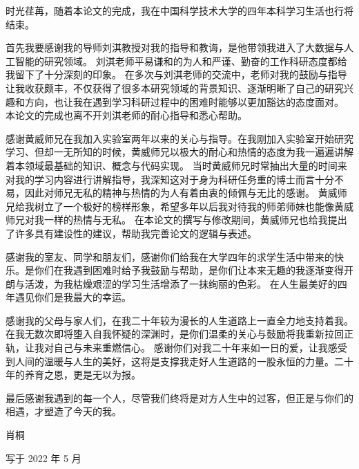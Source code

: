 
\begin{acknowledgements}



    时光荏苒，随着本论文的完成，我在中国科学技术大学的四年本科学习生活也行将结束。

    首先我要感谢我的导师刘淇教授对我的指导和教诲，是他带领我进入了大数据与人工智能的研究领域。
    刘淇老师平易谦和的为人和严谨、勤奋的工作科研态度都给我留下了十分深刻的印象。
    在多次与刘淇老师的交流中，老师对我的鼓励与指导让我收获颇丰，不仅获得了很多本研究领域的背景知识、逐渐明晰了自己的研究兴趣和方向，也让我在遇到学习科研过程中的困难时能够以更加豁达的态度面对。
    本论文的完成也离不开刘淇老师的耐心指导和悉心帮助。

    感谢黄威师兄在我加入实验室两年以来的关心与指导。在我刚加入实验室开始研究学习、但却一无所知的时候，黄威师兄以极大的耐心和热情的态度为我一遍遍讲解着本领域最基础的知识、概念与代码实现。
    当时黄威师兄时常抽出大量的时间来对我的学习内容进行讲解指导，我深知这对于身为科研任务重的博士而言十分不易，因此对师兄无私的精神与热情的为人有着由衷的倾佩与无比的感谢。
    黄威师兄给我树立了一个极好的榜样形象，希望多年以后我对待我的师弟师妹也能像黄威师兄对我一样的热情与无私。
    在本论文的撰写与修改期间，黄威师兄也给我提出了许多具有建设性的建议，帮助我完善论文的逻辑与表述。

    感谢我的室友、同学和朋友们，感谢你们给我在大学四年的求学生活中带来的快乐。是你们在我遇到困难时给予我鼓励与帮助，是你们让本来无趣的我逐渐变得开朗与活泼，为我枯燥艰涩的学习生活增添了一抹绚丽的色彩。
    在人生最美好的四年遇见你们是我最大的幸运。

    感谢我的父母与家人们，在我二十年较为漫长的人生道路上一直全力地支持着我。在我无数次即将堕入自我怀疑的深渊时，是你们温柔的关心与鼓励将我重新拉回正轨，让我对自己与未来重燃信心。
    感谢你们对我二十年来如一日的爱，让我感受到人间的温暖与人生的美好，这将是支撑我走好人生道路的一股永恒的力量。二十年的养育之恩，更是无以为报。

    最后感谢我遇到的每一个人，尽管我们终将是对方人生中的过客，但正是与你们的相遇，才塑造了今天的我。

    \begin{flushright}
        肖桐

        写于 2022 年 5 月
    \end{flushright}
\end{acknowledgements}

